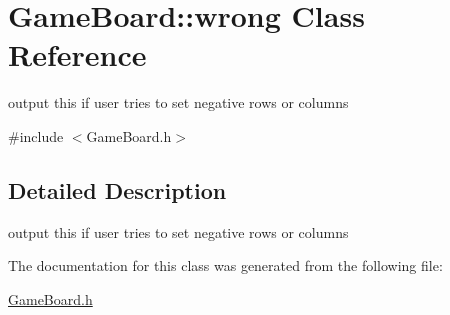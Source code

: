 \hypertarget{class_game_board_1_1wrong}{}\section{Game\+Board\+:\+:wrong Class Reference}
\label{class_game_board_1_1wrong}


output this if user tries to set negative rows or columns  




{\ttfamily \#include $<$Game\+Board.\+h$>$}



\subsection{Detailed Description}
output this if user tries to set negative rows or columns 

The documentation for this class was generated from the following file\+:\begin{DoxyCompactItemize}
\item 
\hyperlink{_game_board_8h}{Game\+Board.\+h}\end{DoxyCompactItemize}
